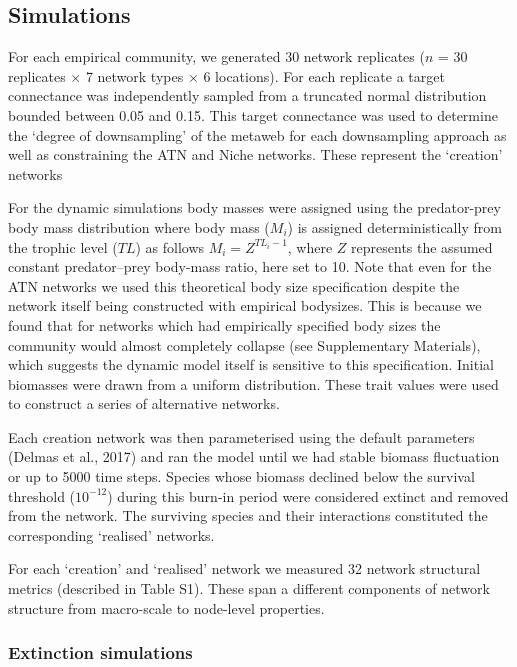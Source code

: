 \documentclass[
]{article}
\begin{document}
\subsection{Simulations}\label{sec-simulations}

For each empirical community, we generated 30 network replicates (\(n\)
= 30 replicates \(\times\) 7 network types \(\times\) 6 locations). For
each replicate a target connectance was independently sampled from a
truncated normal distribution bounded between 0.05 and 0.15. This target
connectance was used to determine the `degree of downsampling' of the
metaweb for each downsampling approach as well as constraining the ATN
and Niche networks. These represent the `creation' networks

For the dynamic simulations body masses were assigned using the
predator-prey body mass distribution where body mass (\(M_i\)) is
assigned deterministically from the trophic level (\(TL\)) as follows
\(M_{i} = Z^{TL_{i}-1}\), where \(Z\) represents the assumed constant
predator--prey body-mass ratio, here set to 10. Note that even for the
ATN networks we used this theoretical body size specification despite
the network itself being constructed with empirical bodysizes. This is
because we found that for networks which had empirically specified body
sizes the community would almost completely collapse (see Supplementary
Materials), which suggests the dynamic model itself is sensitive to this
specification. Initial biomasses were drawn from a uniform distribution.
These trait values were used to construct a series of alternative
networks.

Each creation network was then parameterised using the default
parameters (Delmas et al., 2017) and ran the model until we had stable
biomass fluctuation or up to 5000 time steps. Species whose biomass
declined below the survival threshold (\(10^{-12}\)) during this burn-in
period were considered extinct and removed from the network. The
surviving species and their interactions constituted the corresponding
`realised' networks.

For each `creation' and `realised' network we measured 32 network
structural metrics (described in Table S1). These span a different
components of network structure from macro-scale to node-level
properties.

\subsubsection{Extinction simulations}\label{extinction-simulations}
\end{document}
